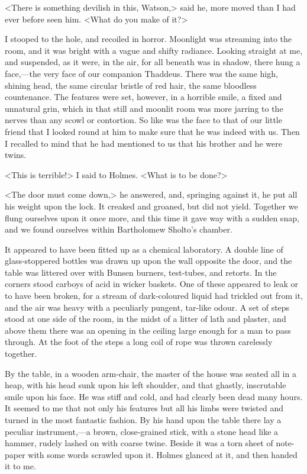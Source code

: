 <There is something devilish in this, Watson,> said he, more moved than I had ever before seen him. <What do you make of it?>

I stooped to the hole, and recoiled in horror. Moonlight was streaming into the room, and it was bright with a vague and shifty radiance. Looking straight at me, and suspended, as it were, in the air, for all beneath was in shadow, there hung a face,—the very face of our companion Thaddeus. There was the same high, shining head, the same circular bristle of red hair, the same bloodless countenance. The features were set, however, in a horrible smile, a fixed and unnatural grin, which in that still and moonlit room was more jarring to the nerves than any scowl or contortion. So like was the face to that of our little friend that I looked round at him to make sure that he was indeed with us. Then I recalled to mind that he had mentioned to us that his brother and he were twins.

<This is terrible!> I said to Holmes. <What is to be done?>

<The door must come down,> he answered, and, springing against it, he put all his weight upon the lock. It creaked and groaned, but did not yield. Together we flung ourselves upon it once more, and this time it gave way with a sudden snap, and we found ourselves within Bartholomew Sholto's chamber.

It appeared to have been fitted up as a chemical laboratory. A double line of glass-stoppered bottles was drawn up upon the wall opposite the door, and the table was littered over with Bunsen burners, test-tubes, and retorts. In the corners stood carboys of acid in wicker baskets. One of these appeared to leak or to have been broken, for a stream of dark-coloured liquid had trickled out from it, and the air was heavy with a peculiarly pungent, tar-like odour. A set of steps stood at one side of the room, in the midst of a litter of lath and plaster, and above them there was an opening in the ceiling large enough for a man to pass through. At the foot of the steps a long coil of rope was thrown carelessly together.

By the table, in a wooden arm-chair, the master of the house was seated all in a heap, with his head sunk upon his left shoulder, and that ghastly, inscrutable smile upon his face. He was stiff and cold, and had clearly been dead many hours. It seemed to me that not only his features but all his limbs were twisted and turned in the most fantastic fashion. By his hand upon the table there lay a peculiar instrument,—a brown, close-grained stick, with a stone head like a hammer, rudely lashed on with coarse twine. Beside it was a torn sheet of note-paper with some words scrawled upon it. Holmes glanced at it, and then handed it to me.

